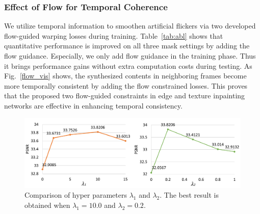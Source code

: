 \subsubsection{Effect of Flow for Temporal Coherence}

We utilize temporal information to smoothen artificial flickers via two developed flow-guided warping losses during training. 
Table~\ref{tab:abl} shows that quantitative performance is improved on all three mask settings by adding the flow guidance. 
Especially, we only add flow guidance in the training phase. 
Thus it brings performance gains without extra computation costs during testing.
%
As Fig.~\ref{flow_vis} shows, the synthesized contents in neighboring frames become more temporally consistent by adding the flow constrained losses.
This proves that the proposed two flow-guided constraints in edge and texture inpainting networks are effective in enhancing temporal consistency.


\begin{figure}[t]
	\centering
	\includegraphics[width=1.0\columnwidth]{lamda1} %
	\caption{Comparison of hyper parameters $\lambda_1$ and $\lambda_2$. The best result is obtained when $\lambda_1=10.0$ and $\lambda_2=0.2$.}
	\label{fig:hparam}
\end{figure}




